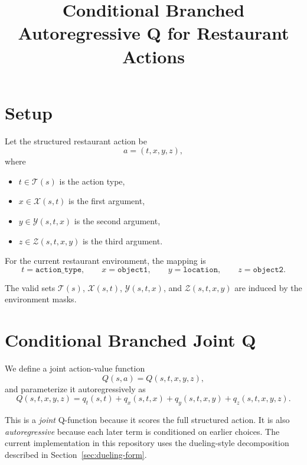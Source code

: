 \documentclass[11pt]{article}
\title{Conditional Branched Autoregressive Q for Restaurant Actions}
\author{}
\date{}
\begin{document}
\maketitle

\section{Setup}
\label{sec:setup}

Let the structured restaurant action be
\[
a = (t, x, y, z),
\]
where
\begin{itemize}
  \item $t \in \mathcal{T}(s)$ is the action type,
  \item $x \in \mathcal{X}(s,t)$ is the first argument,
  \item $y \in \mathcal{Y}(s,t,x)$ is the second argument,
  \item $z \in \mathcal{Z}(s,t,x,y)$ is the third argument.
\end{itemize}

For the current restaurant environment, the mapping is
\[
t = \texttt{action\_type}, \qquad
x = \texttt{object1}, \qquad
y = \texttt{location}, \qquad
z = \texttt{object2}.
\]

The valid sets $\mathcal{T}(s)$, $\mathcal{X}(s,t)$, $\mathcal{Y}(s,t,x)$, and $\mathcal{Z}(s,t,x,y)$ are induced by the environment masks.

\section{Conditional Branched Joint Q}
\label{sec:joint-q}

We define a joint action-value function
\[
Q(s,a) = Q(s,t,x,y,z),
\]
and parameterize it autoregressively as
\begin{equation}
\label{eq:autoregressive-q}
Q(s,t,x,y,z)
= q_t(s,t)
+ q_x(s,t,x)
+ q_y(s,t,x,y)
+ q_z(s,t,x,y,z).
\end{equation}

This is a \emph{joint} Q-function because it scores the full structured action. It is also \emph{autoregressive} because each later term is conditioned on earlier choices. The current implementation in this repository uses the dueling-style decomposition described in Section~\ref{sec:dueling-form}.
\end{document}
